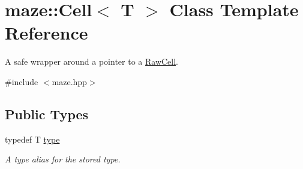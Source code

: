 \hypertarget{classmaze_1_1Cell}{}\section{maze\+:\+:Cell$<$ T $>$ Class Template Reference}
\label{classmaze_1_1Cell}


A safe wrapper around a pointer to a \hyperlink{classmaze_1_1RawCell}{Raw\+Cell}.  




{\ttfamily \#include $<$maze.\+hpp$>$}

\subsection*{Public Types}
\begin{DoxyCompactItemize}
\item 
\mbox{\label{classmaze_1_1Cell_a33cfcdd0d72cc870c85e62852faaf530}} 
typedef T \hyperlink{classmaze_1_1Cell_a33cfcdd0d72cc870c85e62852faaf530}{type}
\begin{DoxyCompactList}\small\item\em A type alias for the stored type. \end{DoxyCompactList}\end{DoxyCompactItemize}
